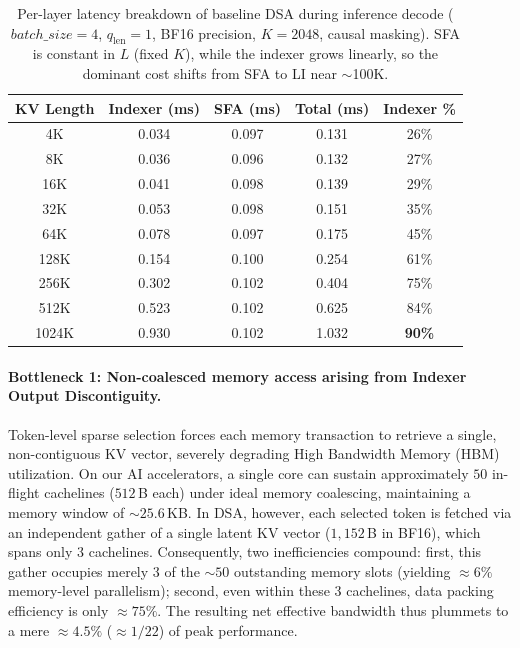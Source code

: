 \documentclass{article}
\begin{document}
\begin{table}[ht]
\centering
\caption{Per-layer latency breakdown of baseline DSA during inference decode ($batch\_size=4$, $q_{\text{len}}=1$, BF16 precision, $K=2048$, causal masking). SFA is constant in $L$ (fixed $K$), while the indexer grows linearly, so the dominant cost shifts from SFA to LI near $\sim$100K.}
\label{tab:decode_breakdown}
\small
\begin{tabular}{ccccc}
\toprule
\textbf{KV Length} & \textbf{Indexer (ms)} & \textbf{SFA (ms)} & \textbf{Total (ms)} & \textbf{Indexer \%} \\
\midrule
4K   & 0.034 & 0.097 & 0.131 & 26\% \\
8K   & 0.036 & 0.096 & 0.132 & 27\% \\
16K  & 0.041 & 0.098 & 0.139 & 29\% \\
32K  & 0.053 & 0.098 & 0.151 & 35\% \\
64K  & 0.078 & 0.097 & 0.175 & 45\% \\
128K & 0.154 & 0.100 & 0.254 & 61\% \\
256K & 0.302 & 0.102 & 0.404 & 75\% \\
512K & 0.523 & 0.102 & 0.625 & 84\% \\
1024K & 0.930 & 0.102 & 1.032 & \textbf{90\%} \\
\bottomrule
\end{tabular}
\end{table}

\paragraph{Bottleneck 1: Non-coalesced memory access arising from Indexer Output Discontiguity.}
Token-level sparse selection forces each memory transaction to retrieve a single, non-contiguous KV vector, severely degrading High Bandwidth Memory (HBM) utilization. On our AI accelerators, a single core can sustain approximately $50$ in-flight cachelines ($512$\,B each) under ideal memory coalescing, maintaining a memory window of ${\sim}25.6$\,KB. In DSA, however, each selected token is fetched via an independent gather of a single latent KV vector ($1{,}152$\,B in BF16), which spans only $3$ cachelines. Consequently, two inefficiencies compound: first, this gather occupies merely $3$ of the ${\sim}50$ outstanding memory slots (yielding $\approx 6\%$ memory-level parallelism); second, even within these $3$ cachelines, data packing efficiency is only $\approx 75\%$. The resulting net effective bandwidth thus plummets to a mere $\approx \mathbf{4.5\%}$ ($\approx 1/22$) of peak performance.
\end{document}
